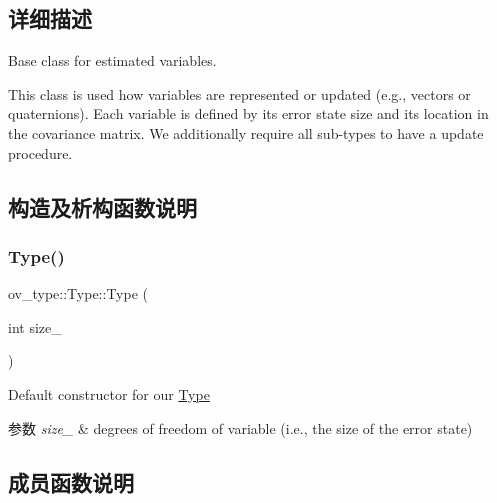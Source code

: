 \subsection{详细描述}
Base class for estimated variables. 

This class is used how variables are represented or updated (e.\+g., vectors or quaternions). Each variable is defined by its error state size and its location in the covariance matrix. We additionally require all sub-\/types to have a update procedure. 

\subsection{构造及析构函数说明}
\mbox{\label{classov__type_1_1Type_a512525c192c9bd721e13eef0cb707496}} 
\subsubsection{\texorpdfstring{Type()}{Type()}}
{\footnotesize\ttfamily ov\+\_\+type\+::\+Type\+::\+Type (\begin{DoxyParamCaption}\item[{int}]{size\+\_\+ }\end{DoxyParamCaption})\hspace{0.3cm}{\ttfamily [inline]}}



Default constructor for our \hyperlink{classov__type_1_1Type}{Type} 


\begin{DoxyParams}{参数}
{\em size\+\_\+} & degrees of freedom of variable (i.\+e., the size of the error state) \\
\hline
\end{DoxyParams}


\subsection{成员函数说明}
\mbox{\label{classov__type_1_1Type_a95fcdbc584256baffc78935de5ab5da3}} 
